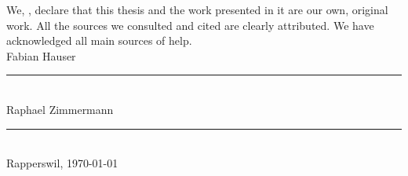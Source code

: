 \begin{declaration}
\addchaptertocentry{\authorshipname} %
\noindent We, \authorname, declare that this thesis and the work presented in it are our own, original work.  All the sources we consulted and cited are clearly attributed. We have acknowledged all main sources of help. \\

\noindent Fabian Hauser\\[2em]
\rule[0.5em]{25em}{0.5pt}\\ %
\noindent Raphael Zimmermann\\[2em]
\rule[0.5em]{25em}{0.5pt}\\ %
\noindent Rapperswil, \today
\end{declaration}

\cleardoublepage



  
